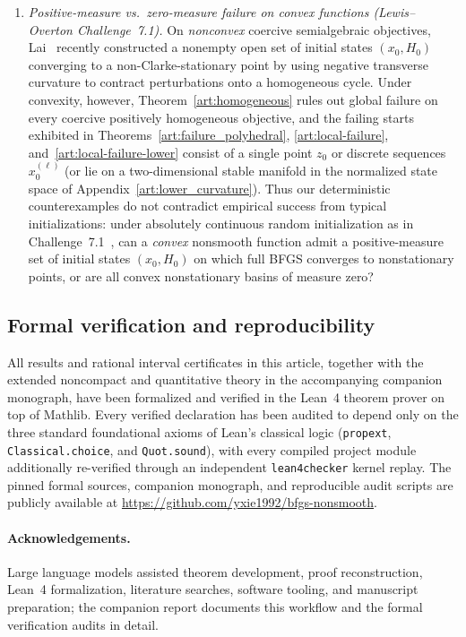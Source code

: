\begin{enumerate}
\item \emph{Positive-measure vs.\ zero-measure failure on convex functions
(Lewis--Overton Challenge~7.1).} On \emph{nonconvex} coercive semialgebraic
objectives, Lai~ recently constructed a nonempty open
set of initial states $(x_0,H_0)$ converging to a non-Clarke-stationary point by
using negative transverse curvature to contract perturbations onto a homogeneous
cycle. Under convexity, however, Theorem~\ref{art:homogeneous} rules out global
failure on every coercive positively homogeneous objective, and the failing
starts exhibited in Theorems~\ref{art:failure_polyhedral}, \ref{art:local-failure},
and~\ref{art:local-failure-lower} consist of a single point $z_0$ or discrete
sequences $x_0^{(\ell)}$ (or lie on a two-dimensional stable manifold in the
normalized state space of Appendix~\ref{art:lower_curvature}). Thus our
deterministic counterexamples do not contradict empirical success from typical
initializations: under absolutely continuous random initialization as in
Challenge~7.1~\cite{LO}, can a \emph{convex} nonsmooth function admit a
positive-measure set of initial states $(x_0,H_0)$ on which full BFGS converges
to nonstationary points, or are all convex nonstationary basins of measure zero?
\end{enumerate}

\subsection{Formal verification and reproducibility}

All results and rational interval certificates in this article, together with
the extended noncompact and quantitative theory in the accompanying companion
monograph, have been formalized and verified in the Lean~4 theorem prover on top
of \textsf{Mathlib}. Every verified declaration has been audited to depend only
on the three standard foundational axioms of Lean's classical logic
(\texttt{propext}, \texttt{Classical.choice}, and \texttt{Quot.sound}), with
every compiled project module additionally re-verified through an independent
\texttt{lean4checker} kernel replay. The pinned formal sources,
companion monograph, and reproducible audit scripts are publicly available at
\url{https://github.com/yxie1992/bfgs-nonsmooth}.

\paragraph{Acknowledgements.}
Large language models assisted theorem development, proof reconstruction, Lean~4
formalization, literature searches, software tooling, and manuscript preparation;
the companion report documents this workflow and the formal verification audits
in detail.

